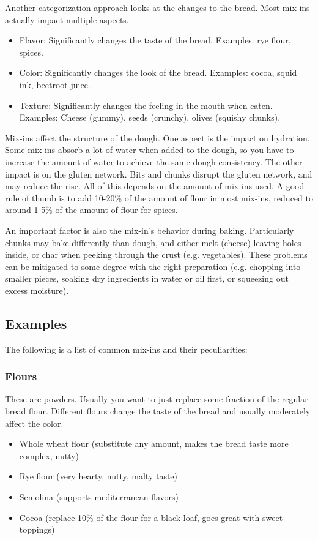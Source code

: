 Another categorization approach looks at the changes to the bread. Most mix-ins actually impact multiple aspects.
\begin{itemize}
  \item Flavor: Significantly changes the taste of the bread. Examples: rye flour, spices.
  \item Color: Significantly changes the look of the bread. Examples: cocoa, squid ink, beetroot juice.
  \item Texture: Significantly changes the feeling in the mouth when eaten. Examples: Cheese (gummy), seeds (crunchy), olives (squishy chunks).
\end{itemize}

Mix-ins affect the structure of the dough. One aspect is the impact on hydration. Some mix-ins absorb a lot of water when added to the dough, so you have to increase the amount of water to achieve the same dough consistency. The other impact is on the gluten network. Bits and chunks disrupt the gluten network, and may reduce the rise. All of this depends on the amount of mix-ins used. A good rule of thumb is to add 10-20\% of the amount of flour in most mix-ins, reduced to around 1-5\% of the amount of flour for spices.

An important factor is also the mix-in's behavior during baking. Particularly chunks may bake differently than dough, and either melt (cheese) leaving holes inside, or char when peeking through the crust (e.g. vegetables). These problems can be mitigated to some degree with the right preparation (e.g. chopping into smaller pieces, soaking dry ingredients in water or oil first, or squeezing out excess moisture).

\subsection{Examples}

The following is a list of common mix-ins and their peculiarities:

\subsubsection{Flours}
These are powders. Usually you want to just replace some fraction of the regular bread flour. Different flours change the taste of the bread and usually moderately affect the color.
\begin{itemize}
  \item Whole wheat flour (substitute any amount, makes the bread taste more complex, nutty)
  \item Rye flour (very hearty, nutty, malty taste)
  \item Semolina (supports mediterranean flavors)
  \item Cocoa (replace 10\% of the flour for a black loaf, goes great with sweet toppings)
\end{itemize}

